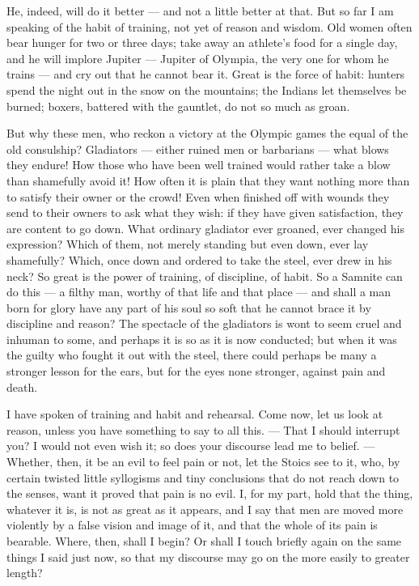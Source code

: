  He, indeed, will do it better — and not a little better at that. But so far I am speaking of the habit of training, not yet of reason and wisdom. Old women often bear hunger for two or three days; take away an athlete's food for a single day, and he will implore Jupiter — Jupiter of Olympia, the very one for whom he trains — and cry out that he cannot bear it. Great is the force of habit: hunters spend the night out in the snow on the mountains; the Indians let themselves be burned; boxers, battered with the gauntlet, do not so much as groan.

 But why these men, who reckon a victory at the Olympic games the equal of the old consulship? Gladiators — either ruined men or barbarians — what blows they endure! How those who have been well trained would rather take a blow than shamefully avoid it! How often it is plain that they want nothing more than to satisfy their owner or the crowd! Even when finished off with wounds they send to their owners to ask what they wish: if they have given satisfaction, they are content to go down. What ordinary gladiator ever groaned, ever changed his expression? Which of them, not merely standing but even down, ever lay shamefully? Which, once down and ordered to take the steel, ever drew in his neck? So great is the power of training, of discipline, of habit. So a Samnite can do this — a filthy man, worthy of that life and that place — and shall a man born for glory have any part of his soul so soft that he cannot brace it by discipline and reason? The spectacle of the gladiators is wont to seem cruel and inhuman to some, and perhaps it is so as it is now conducted; but when it was the guilty who fought it out with the steel, there could perhaps be many a stronger lesson for the ears, but for the eyes none stronger, against pain and death.

 I have spoken of training and habit and rehearsal. Come now, let us look at reason, unless you have something to say to all this. — That I should interrupt you? I would not even wish it; so does your discourse lead me to belief. — Whether, then, it be an evil to feel pain or not, let the Stoics see to it, who, by certain twisted little syllogisms and tiny conclusions that do not reach down to the senses, want it proved that pain is no evil. I, for my part, hold that the thing, whatever it is, is not as great as it appears, and I say that men are moved more violently by a false vision and image of it, and that the whole of its pain is bearable. Where, then, shall I begin? Or shall I touch briefly again on the same things I said just now, so that my discourse may go on the more easily to greater length?

